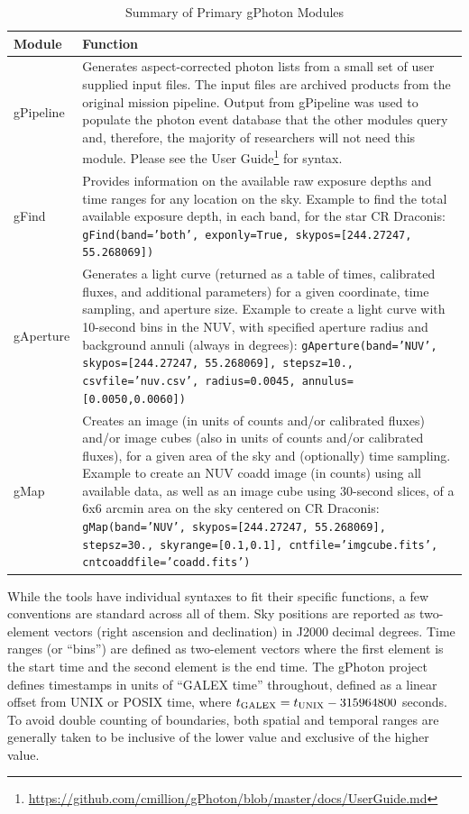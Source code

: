 \documentclass[preprint]{aastex}
\begin{document}
\begin{table}[h]
\begin{tabular}{|L{2cm}|L{13cm}|}
\hline
	{\bf Module} & {\bf Function}\\\hline
	gPipeline & Generates aspect-corrected photon lists from a small set of user supplied input files. The input files are archived products from the original mission pipeline. Output from gPipeline was used to populate the photon event database that the other modules query and, therefore, the majority of researchers will not need this module. Please see the User Guide\footnote{\url{https://github.com/cmillion/gPhoton/blob/master/docs/UserGuide.md}} for syntax.\\\hline
	gFind & Provides information on the available raw exposure depths and time ranges for any location on the sky. Example to find the total available exposure depth, in each band, for the star CR Draconis: \parbox[t]{13cm}{\texttt{gFind(band='both', exponly=True, skypos=[244.27247, 55.268069])}}\\\hline
	gAperture & Generates a light curve (returned as a table of times, calibrated fluxes, and additional parameters) for a given coordinate, time sampling, and aperture size. Example to create a light curve with 10-second bins in the NUV, with specified aperture radius and background annuli (always in degrees): \parbox[t]{13cm}{\texttt{gAperture(band='NUV', skypos=[244.27247, 55.268069], stepsz=10., csvfile='nuv.csv', radius=0.0045, annulus=[0.0050,0.0060])}}\\\hline
	gMap & Creates an image (in units of counts and/or calibrated fluxes) and/or image cubes (also in units of counts and/or calibrated fluxes), for a given area of the sky and (optionally) time sampling. Example to create an NUV coadd image (in counts) using all available data, as well as an image cube using 30-second slices, of a 6x6 arcmin area on the sky centered on CR Draconis: \parbox[t]{13cm}{\texttt{gMap(band='NUV', skypos=[244.27247, 55.268069], stepsz=30., skyrange=[0.1,0.1], cntfile='imgcube.fits', cntcoaddfile='coadd.fits')}}\\\hline
\end{tabular}
\caption{Summary of Primary gPhoton Modules}
\label{moduledesc}
\end{table}

While the tools have individual syntaxes to fit their specific functions, a few conventions are standard across all of them. Sky positions are reported as two-element vectors (right ascension and declination) in J2000 decimal degrees. Time ranges (or ``bins'') are defined as two-element vectors where the first element is the start time and the second element is the end time. The gPhoton project defines timestamps in units of ``GALEX time'' throughout, defined as a linear offset from UNIX or POSIX time, where $t_{\rm{GALEX}} = t_{\rm{UNIX}} - 315964800$ seconds. To avoid double counting of boundaries, both spatial and temporal ranges are generally taken to be inclusive of the lower value and exclusive of the higher value.
\end{document}
